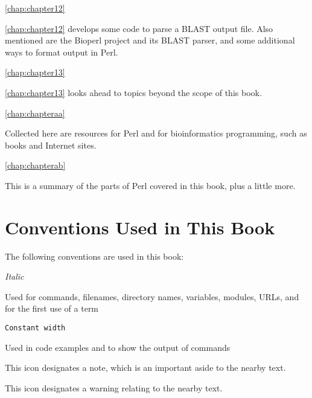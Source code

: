 \autoref{chap:chapter12}
\begin{adjustwidth}{1cm}{0cm}
\autoref{chap:chapter12} develops some code to parse a BLAST output file. Also mentioned are the Bioperl project and its BLAST parser, and some additional ways to format output in Perl.
\end{adjustwidth}

\autoref{chap:chapter13}
\begin{adjustwidth}{1cm}{0cm}
\autoref{chap:chapter13} looks ahead to topics beyond the scope of this book.
\end{adjustwidth}

\autoref{chap:chapteraa}
\begin{adjustwidth}{1cm}{0cm}
Collected here are resources for Perl and for bioinformatics programming, such as books and Internet sites.
\end{adjustwidth}

\autoref{chap:chapterab}
\begin{adjustwidth}{1cm}{0cm}
This is a summary of the parts of Perl covered in this book, plus a little more.
\end{adjustwidth}

\section*{Conventions Used in This Book}
The following conventions are used in this book:

\textit{Italic}
\begin{adjustwidth}{1cm}{0cm}
Used for commands, filenames, directory names, variables, modules, URLs, and for the first use of a term 
\end{adjustwidth}

\texttt{Constant width}
\begin{adjustwidth}{1cm}{0cm}
Used in code examples and to show the output of commands
\end{adjustwidth}

\begin{adjustwidth}{2cm}{2cm}
This icon designates a note, which is an important aside to the nearby text.
\end{adjustwidth}

\begin{adjustwidth}{2cm}{2cm}
This icon designates a warning relating to the nearby text.
\end{adjustwidth}

